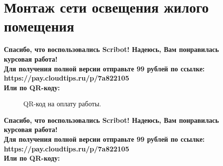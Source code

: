 \documentclass{article}
\begin{document}
\section{Монтаж сети освещения жилого помещения}
\begin{center}
    \textbf{
        Спасибо, что воспользовались Scribot! Надеюсь, Вам понравилась курсовая работа!\\
        Для получения полной версии отправьте 99 рублей по ссылке:\\
        https://pay.cloudtips.ru/p/7a822105\\
        Или по QR-коду:\\
    }
\end{center}
\begin{figure}[h]
    \caption{QR-код на оплату работы.}
    \label{ris:image}
\end{figure}
\newpage
\begin{center}
    \textbf{
        Спасибо, что воспользовались Scribot! Надеюсь, Вам понравилась курсовая работа!\\
        Для получения полной версии отправьте 99 рублей по ссылке:\\
        https://pay.cloudtips.ru/p/7a822105\\
        Или по QR-коду:\\
    }
\end{center}
\end{document}

